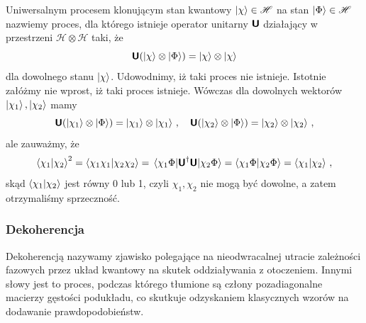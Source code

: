 \documentclass{myclass}
\begin{document}
Uniwersalnym procesem klonującym stan kwantowy \(\ket{\chi}\in\mathscr{H}\) na stan
\(\ket{\Phi}\in\mathscr{H}\) nazwiemy proces, dla którego istnieje operator unitarny \(\boldsymbol{\mathsf{U}}\)
działający w przestrzeni \(\mathscr{H}\otimes\mathscr{H}\) taki, że
\begin{equation*}
    \boldsymbol{\mathsf{U}}(\ket{\chi}\otimes\ket{\Phi}) = \ket{\chi}\otimes\ket{\chi}
\end{equation*}
dla dowolnego stanu \(\ket{\chi}\). Udowodnimy, iż taki proces nie istnieje. Istotnie załóżmy nie
wprost, iż taki proces istnieje. Wówczas dla dowolnych wektorów \(\ket{\chi_1}, \ket{\chi_2}\) mamy
\begin{equation*}
    \boldsymbol{\mathsf{U}}(\ket{\chi_1}\otimes\ket{\Phi}) = \ket{\chi_1}\otimes\ket{\chi_1}\,,\quad \boldsymbol{\mathsf{U}}(\ket{\chi_2}\otimes\ket{\Phi}) = \ket{\chi_2}\otimes\ket{\chi_2}\,,
\end{equation*}
ale zauważmy, że
\begin{equation*}
     \braket{\chi_1}{\chi_2}^2 = \braket{\chi_1\chi_1}{\chi_2\chi_2} = \mel{\chi_1\Phi}{\boldsymbol{\mathsf{U}}^\dagger\boldsymbol{\mathsf{U}}}{\chi_2\Phi} = \braket{\chi_1\Phi}{\chi_2\Phi} = \braket{\chi_1}{\chi_2}\,,
\end{equation*}
skąd \(\braket{\chi_1}{\chi_2}\) jest równy 0 lub 1, czyli \(\chi_1, \chi_2\) nie mogą być dowolne,
a zatem otrzymaliśmy sprzeczność.

\subsubsection{Dekoherencja}

Dekoherencją nazywamy zjawisko polegające na nieodwracalnej utracie zależności fazowych przez układ
kwantowy na skutek oddziaływania z otoczeniem. Innymi słowy jest to proces, podczas którego tłumione
są człony pozadiagonalne macierzy gęstości podukładu, co skutkuje odzyskaniem klasycznych wzorów na
dodawanie prawdopodobieństw.
\end{document}
